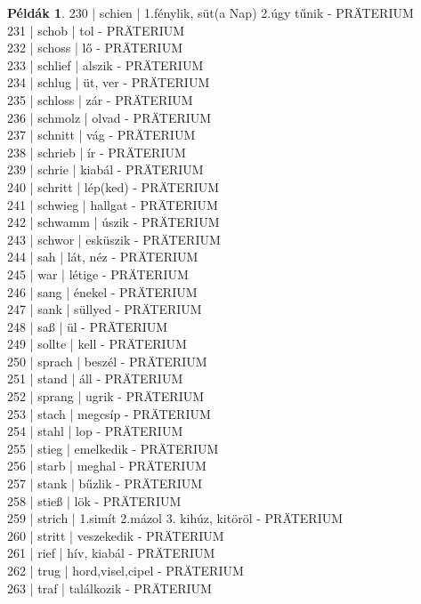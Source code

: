 \documentclass{article}
\theoremstyle{definition}
\newtheorem*{exmp}{Példák}
\begin{document}
\begin{exmp}
230 | schien | 1.fénylik, süt(a Nap) 2.úgy tűnik - PRÄTERIUM\\
231 | schob | tol - PRÄTERIUM\\
232 | schoss | lő - PRÄTERIUM\\
233 | schlief | alszik - PRÄTERIUM\\
234 | schlug | üt, ver - PRÄTERIUM\\
235 | schloss | zár - PRÄTERIUM\\
236 | schmolz | olvad - PRÄTERIUM\\
237 | schnitt | vág - PRÄTERIUM\\
238 | schrieb | ír - PRÄTERIUM\\
239 | schrie | kiabál - PRÄTERIUM\\
240 | schritt | lép(ked) - PRÄTERIUM\\
241 | schwieg | hallgat - PRÄTERIUM\\
242 | schwamm | úszik - PRÄTERIUM\\
243 | schwor | esküszik - PRÄTERIUM\\
244 | sah | lát, néz - PRÄTERIUM\\
245 | war | létige - PRÄTERIUM\\
246 | sang | énekel - PRÄTERIUM\\
247 | sank | süllyed - PRÄTERIUM\\
248 | saß | ül - PRÄTERIUM\\
249 | sollte | kell - PRÄTERIUM\\
250 | sprach | beszél - PRÄTERIUM\\
251 | stand | áll - PRÄTERIUM\\
252 | sprang | ugrik - PRÄTERIUM\\
253 | stach | megcsíp - PRÄTERIUM\\
254 | stahl | lop - PRÄTERIUM\\
255 | stieg | emelkedik - PRÄTERIUM\\
256 | starb | meghal - PRÄTERIUM\\
257 | stank | bűzlik - PRÄTERIUM\\
258 | stieß | lök - PRÄTERIUM\\
259 | strich | 1.simít 2.mázol 3. kihúz, kitöröl - PRÄTERIUM\\
260 | stritt | veszekedik - PRÄTERIUM\\
261 | rief | hív, kiabál - PRÄTERIUM\\
262 | trug | hord,visel,cipel - PRÄTERIUM\\
263 | traf | találkozik - PRÄTERIUM\\

\end{exmp}
\end{document}
